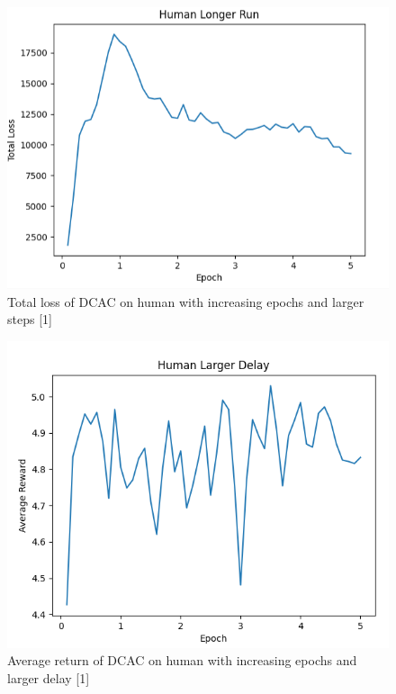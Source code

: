\documentclass{article} %
\begin{document}
\begin{figure}[H]
\begin{center}
\includegraphics[scale=0.4]{images/longer_human_loss.png}
\end{center}
\caption{Total loss of DCAC on human with increasing epochs and larger steps [1]}
\label{totalLossLong}
\end{figure}

\begin{figure}[H]
\begin{center}
\includegraphics[scale=0.3]{images/delay_human_reward.png}
\end{center}
\caption{Average return of DCAC on human with increasing epochs and larger delay [1]}
\label{averageReturnDelay}
\end{figure}
\end{document}
